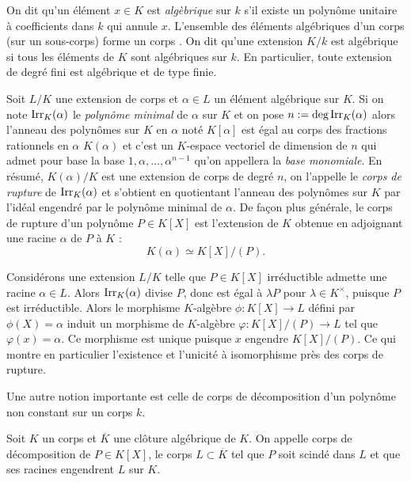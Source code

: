 \documentclass[a4paper]{article} %
\numberwithin{section}{part}
\numberwithin{equation}{section}
\newcommand\Irr[2]{\textup{Irr}_{#1}(#2)}
\begin{document}
On dit qu'un élément $x\in K$ est \emph{algèbrique} sur $k$ s'il existe un 
polynôme unitaire à coefficients dans $k$ qui annule $x$. L'ensemble des 
éléments algébriques d'un corps (sur un sous-corps) forme un corps \cite[p.~64, 
théorème 1.14]{Per}. On dit qu'une extension $K/k$ est algébrique si tous les 
éléments de $K$ sont algébriques sur $k$. En particulier, toute extension de
degré fini est algébrique et de type finie.


Soit $L/K$ une extension de corps et $\alpha\in L$ un élément algébrique sur
$K$. Si on note $\Irr{K}{\alpha}$ le \emph{polynôme minimal} de $\alpha$ sur $K$
et on pose $n := \textup{deg\,}\Irr{K}{\alpha}$ alors l'anneau des polynômes
sur $K$ en $\alpha$ noté $K[\alpha]$ est égal au corps des fractions rationnels
en $\alpha$ $K(\alpha)$ et c'est un $K$-espace vectoriel de dimension de $n$ qui
admet pour base la base $1,\alpha,\dots,\alpha^{n-1}$ qu'on appellera la 
\emph{base monomiale}. En résumé, $K(\alpha)/K$ est une extension de corps de
degré $n$, on l'appelle le \emph{corps de rupture} de $\Irr{K}{\alpha}$ et
s'obtient en quotientant l'anneau des polynômes sur $K$ par l'idéal engendré par
le polynôme minimal de $\alpha$. De façon plus générale, le corps de rupture 
d'un polynôme $P\in K[X]$ est l'extension de $K$ obtenue en adjoignant une 
racine $\alpha$ de $P$ à $K$ :
\begin{equation}
K(\alpha)\simeq K[X]/(P).
\end{equation}

Considérons une extension $L/K$ telle que $P\in K[X]$ irréductible admette une 
racine $\alpha\in L$. Alors $\Irr{K}{\alpha}$ divise $P$, donc est égal à 
$\lambda P$ pour $\lambda\in K^{\times}$, puisque $P$ est irréductible. Alors 
le morphisme $K$-algèbre $\phi : K[X] \to L$ défini par $\phi(X) = \alpha$ 
induit un morphisme de $K$-algèbre $\varphi : K[X]/(P) \to L$ tel que 
$\varphi(x) = \alpha$. Ce morphisme est unique puisque $x$ engendre $K[X]/(P)$. 
Ce qui montre en particulier l'existence et l'unicité à isomorphisme près des 
corps de rupture.\par
\vspace{0.3cm}
Une autre notion importante est celle de corps de décomposition d'un polynôme 
non constant sur un corps $k$.

\begin{defn}
\label{def:dec}
Soit $K$ un corps et $\overline{K}$ une clôture algébrique de $K$. On appelle
corps de décomposition de $P\in K[X]$, le corps $L\subset\overline{K}$ tel que
$P$ soit scindé dans $L$ et que ses racines engendrent $L$ sur $K$.
\end{defn}
\end{document}
